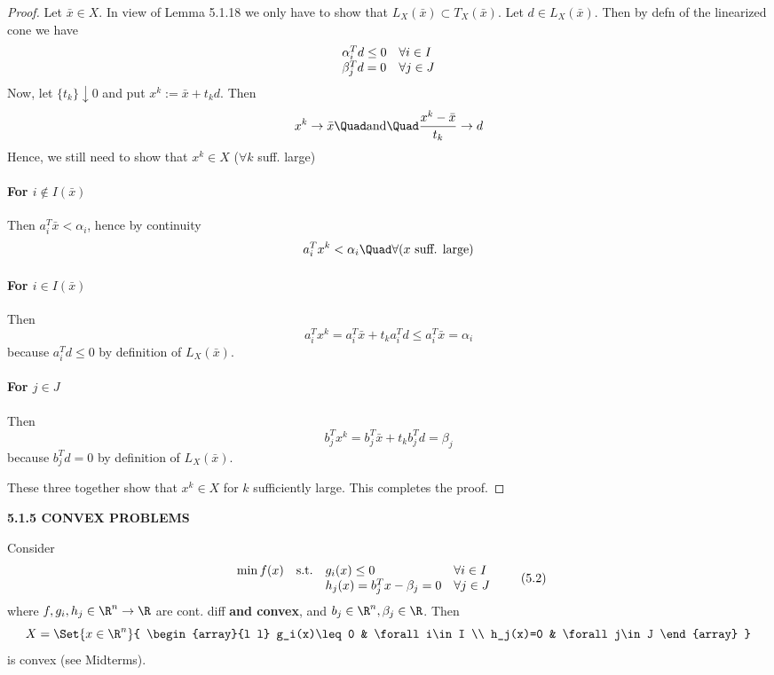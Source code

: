 \begin{proof}
	\def\LC{L_X(\bar x)}
	\def\TC{T_X(\bar x)}
	\def\Active{I(\bar x)}

	Let $\bar x\in X$. In view of Lemma 5.1.18 we only have to show that
	$\LC\subset\TC$. Let $d\in\LC$. Then by defn of the linearized cone
	we have
	$$
		\begin{array}{l l}
			\alpha_i^Td\leq0 & \forall i\in I \\
			\beta_j^Td=0     & \forall j\in J
		\end{array}
	$$
	Now, let $\{t_k\}\downarrow0$ and put $x^k:=\bar x+t_kd$. Then
	$$
		x^k\to\bar x \Quad\text{and}\Quad \frac{x^k-\bar x}{t_k}\to d
	$$
	Hence, we still need to show that $x^k\in X$ ($\forall k$ suff.
	large)

	\paragraph{For $i\notin\Active$} Then $a_i^T\bar x<\alpha_i$, hence
	by continuity
	$$
		a_i^Tx^k<\alpha_i\Quad\forall(x\text{ suff. large})
	$$

	\paragraph{For $i\in\Active$} Then
	$$
		a_i^Tx^k = a_i^T\bar x + t_ka_i^Td \leq a_i^T\bar x = \alpha_i
	$$
	because $a_i^Td\leq0$ by definition of $\LC$.

	\paragraph{For $j\in J$} Then
	$$
		b_j^T x^k=b_j^T\bar x+t_kb_j^Td=\beta_j
	$$
	because $b_j^Td=0$ by definition of $\LC$.

	These three together show that $x^k\in X$ for $k$ sufficiently
	large. This completes the proof.
\end{proof}

\textbf{5.1.5 CONVEX PROBLEMS}

Consider
\begin{equation}
	\begin{array}{l l l l}
		\min f(x) & \text{s.t.} & g_i(x)\leq0             & \forall i\in I \\
		          &             & h_j(x)=b_j^Tx-\beta_j=0 & \forall j\in J
	\end{array}
	\tag*{(5.2)}
\end{equation}
where $f,g_i,h_j\in\R^n\to\R$ are cont. diff \textbf{and convex}, and
$b_j\in\R^n,\beta_j\in\R$. Then
$$
	X=\Set{x\in\R^n}{
		\begin{array}{l l}
			g_i(x)\leq0 & \forall i\in I \\
			h_j(x)=0    & \forall j\in J
		\end{array}
	}
$$
is convex (see Midterms).

